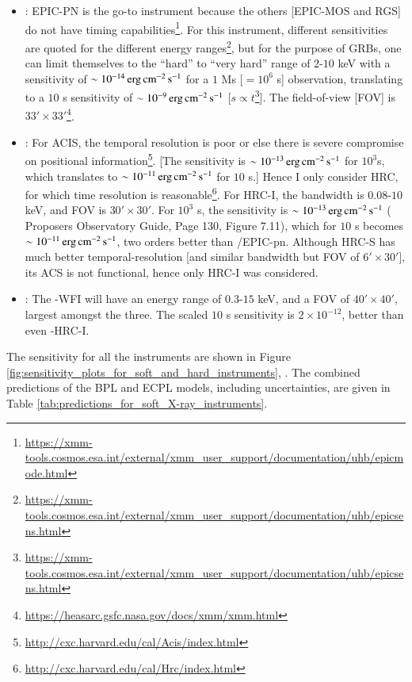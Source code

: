 \begin{itemize}
\item \X: EPIC-PN is the go-to instrument because the others [EPIC-MOS and RGS] do not have timing capabilities\footnote{\url{https://xmm-tools.cosmos.esa.int/external/xmm_user_support/documentation/uhb/epicmode.html}}. For this instrument, different sensitivities are quoted for the different energy ranges\footnote{\url{https://xmm-tools.cosmos.esa.int/external/xmm_user_support/documentation/uhb/epicsens.html}}, but for the purpose of GRBs, one can limit themselves to the ``hard'' to ``very hard'' range of $2$-$10$ keV with a sensitivity of $\sim 10^{-14} \, \rm erg \, cm^{-2} \, s^{-1}$ for a $1$ Ms [$= 10^{6}$ s] observation, translating to a $10$ s sensitivity of $\sim 10^{-9} \, \rm erg \, cm^{-2} \, s^{-1}$ [$s \propto t$\footnote{\url{https://xmm-tools.cosmos.esa.int/external/xmm_user_support/documentation/uhb/epicsens.html}}]. The field-of-view [FOV] is $33' \times 33'$\footnote{\url{https://heasarc.gsfc.nasa.gov/docs/xmm/xmm.html}}.

\item \C: For ACIS, the temporal resolution is poor or else there is severe compromise on positional information\footnote{\url{http://cxc.harvard.edu/cal/Acis/index.html}}. [The sensitivity is $\sim 10^{-13} \, \rm erg \, cm^{-2} \, s^{-1}$ for $10^{3}$s, which translates to $\sim 10^{-11} \, \rm erg \, cm^{-2} \, s^{-1}$ for $10$ s.] Hence I only consider HRC, for which time resolution is reasonable\footnote{\url{http://cxc.harvard.edu/cal/Hrc/index.html}}. For HRC-I, the bandwidth is $0.08$-$10$ keV, and FOV is $30' \times 30'$. For $10^{3}$ s, the sensitivity is $\sim 10^{-13} \, \rm erg \, cm^{-2} \, s^{-1}$ (\C\, Proposers Observatory Guide, Page 130, Figure 7.11), which for $10$ s becomes $\sim 10^{-11} \, \rm erg \, cm^{-2} \, s^{-1}$, two orders better than \X /EPIC-pn. Although HRC-S has much better temporal-resolution [and similar bandwidth but FOV of $6' \times 30'$], its ACS is not functional, hence only HRC-I was considered.

\item \A: The \A -WFI will have an energy range of $0.3$-$15$ keV, and a FOV of $40' \times 40'$, largest amongst the three. The scaled $10$ s sensitivity is $2 \times 10^{-12}$, better than even \C -HRC-I.
\end{itemize}

The sensitivity for all the instruments are shown in Figure \ref{fig:sensitivity_plots_for_soft_and_hard_instruments}, \eL. The combined predictions of the BPL and ECPL models, including uncertainties, are given in Table \ref{tab:predictions_for_soft_X-ray_instruments}.


